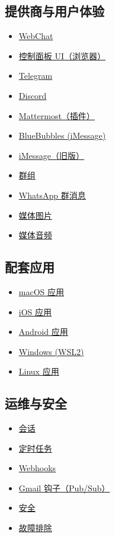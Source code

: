 \subsection{提供商与用户体验}


\begin{itemize}
  \item \href{/web/webchat}{WebChat}
  \item \href{/web/control-ui}{控制面板 UI（浏览器）}
  \item \href{/channels/telegram}{Telegram}
  \item \href{/channels/discord}{Discord}
  \item \href{/channels/mattermost}{Mattermost（插件）}
  \item \href{/channels/bluebubbles}{BlueBubbles (iMessage)}
  \item \href{/channels/imessage}{iMessage（旧版）}
  \item \href{/channels/groups}{群组}
  \item \href{/channels/group-messages}{WhatsApp 群消息}
  \item \href{/nodes/images}{媒体图片}
  \item \href{/nodes/audio}{媒体音频}
\end{itemize}


\subsection{配套应用}


\begin{itemize}
  \item \href{/platforms/macos}{macOS 应用}
  \item \href{/platforms/ios}{iOS 应用}
  \item \href{/platforms/android}{Android 应用}
  \item \href{/platforms/windows}{Windows (WSL2)}
  \item \href{/platforms/linux}{Linux 应用}
\end{itemize}


\subsection{运维与安全}


\begin{itemize}
  \item \href{/concepts/session}{会话}
  \item \href{/automation/cron-jobs}{定时任务}
  \item \href{/automation/webhook}{Webhooks}
  \item \href{/automation/gmail-pubsub}{Gmail 钩子（Pub/Sub）}
  \item \href{/gateway/security}{安全}
  \item \href{/gateway/troubleshooting}{故障排除}
\end{itemize}



